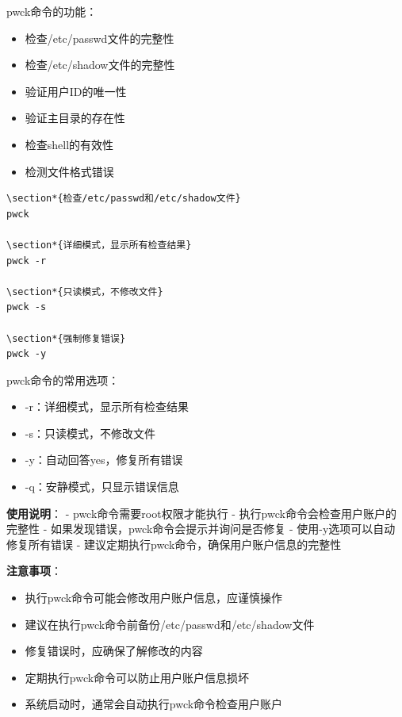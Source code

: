 \documentclass[12pt,UTF8]{ctexbook}
\begin{document}
pwck命令的功能：
\begin{itemize}
    \item 检查/etc/passwd文件的完整性
    \item 检查/etc/shadow文件的完整性
    \item 验证用户ID的唯一性
    \item 验证主目录的存在性
    \item 检查shell的有效性
    \item 检测文件格式错误
\end{itemize}

\begin{verbatim}
\section*{检查/etc/passwd和/etc/shadow文件}
pwck

\section*{详细模式，显示所有检查结果}
pwck -r

\section*{只读模式，不修改文件}
pwck -s

\section*{强制修复错误}
pwck -y
\end{verbatim}

pwck命令的常用选项：
\begin{itemize}
    \item -r：详细模式，显示所有检查结果
    \item -s：只读模式，不修改文件
    \item -y：自动回答yes，修复所有错误
    \item -q：安静模式，只显示错误信息
\end{itemize}

\textbf{使用说明}：
- pwck命令需要root权限才能执行
- 执行pwck命令会检查用户账户的完整性
- 如果发现错误，pwck命令会提示并询问是否修复
- 使用-y选项可以自动修复所有错误
- 建议定期执行pwck命令，确保用户账户信息的完整性

\textbf{注意事项}：
\begin{itemize}
    \item 执行pwck命令可能会修改用户账户信息，应谨慎操作
    \item 建议在执行pwck命令前备份/etc/passwd和/etc/shadow文件
    \item 修复错误时，应确保了解修改的内容
    \item 定期执行pwck命令可以防止用户账户信息损坏
    \item 系统启动时，通常会自动执行pwck命令检查用户账户
\end{itemize}
\end{document}
